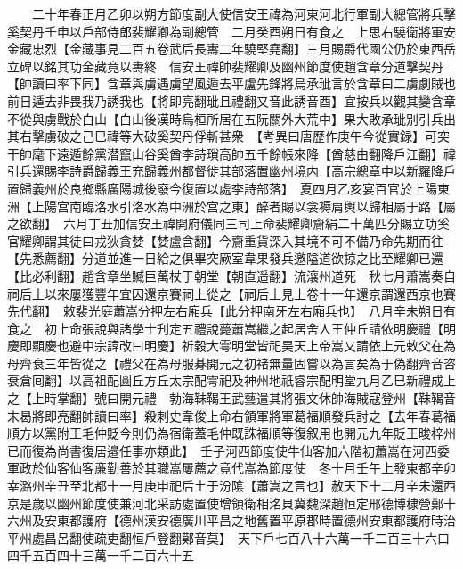　　二十年春正月乙卯以朔方節度副大使信安王禕為河東河北行軍副大總管將兵擊奚契丹壬申以戶部侍郎裴耀卿為副總管　二月癸酉朔日有食之　上思右驍衛將軍安金藏忠烈【金藏事見二百五卷武后長夀二年驍堅堯翻】三月賜爵代國公仍於東西岳立碑以銘其功金藏竟以夀終　信安王禕帥裴耀卿及幽州節度使趙含章分道擊契丹【帥讀曰率下同】含章與虜遇虜望風遁去平盧先鋒將烏承玼言於含章曰二虜劇賊也前日遁去非畏我乃誘我也【將即亮翻玼且禮翻又音此誘音酉】宜按兵以觀其變含章不從與虜戰於白山【白山後漢時烏桓所居在五阮關外大荒中】果大敗承玼别引兵出其右擊虜破之己巳禕等大破奚契丹俘斬甚衆　【考異曰唐歷作庚午今從實録】可突干帥麾下遠遁餘黨潜竄山谷奚酋李詩瑣高帥五千餘帳來降【酋慈由翻降戶江翻】禕引兵還賜李詩爵歸義王充歸義州都督徙其部落置幽州境内【高宗總章中以新羅降戶置歸義州於良鄉縣廣陽城後廢今復置以處李詩部落】　夏四月乙亥宴百官於上陽東洲【上陽宫南臨洛水引洛水為中洲於宫之東】醉者賜以衾褥肩輿以歸相屬于路【屬之欲翻】　六月丁丑加信安王禕開府儀同三司上命裴耀卿齎絹二十萬匹分賜立功奚官耀卿謂其徒曰戎狄貪婪【婪盧含翻】今齎重貨深入其境不可不備乃命先期而往【先悉薦翻】分道並進一日給之俱畢突厥室韋果發兵邀隘道欲掠之比至耀卿已還【比必利翻】趙含章坐贓巨萬杖于朝堂【朝直遥翻】流瀼州道死　秋七月蕭嵩奏自祠后土以來屢獲豐年宜因還京賽祠上從之【祠后土見上卷十一年還京謂還西京也賽先代翻】　敕裴光庭蕭嵩分押左右廂兵【此分押南牙左右廂兵也】　八月辛未朔日有食之　初上命張說與諸學士刋定五禮說薨蕭嵩繼之起居舍人王仲丘請依明慶禮【明慶即顯慶也避中宗諱改曰明慶】祈穀大雩明堂皆祀昊天上帝嵩又請依上元敕父在為母齊衰三年皆從之【禮父在為母服朞開元之初禇無量固嘗以為言矣為于偽翻齊音咨衰倉囘翻】以高祖配圓丘方丘太宗配雩祀及神州地祇睿宗配明堂九月乙巳新禮成上之【上時掌翻】號曰開元禮　勃海靺鞨王武藝遣其將張文休帥海賊寇登州【靺鞨音末曷將即亮翻帥讀曰率】殺刺史韋俊上命右領軍將軍葛福順發兵討之【去年春葛福順方以黨附王毛仲貶今則仍為宿衛蓋毛仲既誅福順等復叙用也開元九年貶王晙梓州已而復為尚書復居邉任事亦類此】　壬子河西節度使牛仙客加六階初蕭嵩在河西委軍政於仙客仙客亷勤善於其職嵩屢薦之竟代嵩為節度使　冬十月壬午上發東都辛卯幸潞州辛丑至北都十一月庚申祀后土于汾隂【蕭嵩之言也】赦天下十二月辛未還西京是歲以幽州節度使兼河北采訪處置使增領衛相洺貝冀魏深趙恒定邢德博棣營鄚十六州及安東都護府【德州漢安德廣川平昌之地舊置平原郡時置德州安東都護府時治平州處昌呂翻使疏吏翻恒戶登翻鄚音莫】　天下戶七百八十六萬一千二百三十六口四千五百四十三萬一千二百六十五


